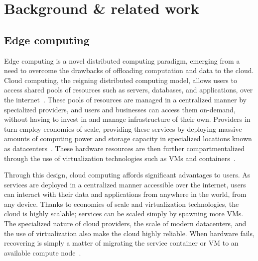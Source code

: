 \section{Background \& related work}

\subsection{Edge computing}

Edge computing is a novel distributed computing paradigm, emerging from a need to overcome the drawbacks of offloading computation and data to the cloud.
Cloud computing, the reigning distributed computing model, allows users to access shared pools of resources such as servers, databases, and applications, over the internet~\cite{gai2012towards}.
These pools of resources are managed in a centralized manner by specialized providers, and users and businesses can access them on-demand, without having to invest in and manage infrastructure of their own.
Providers in turn employ economies of scale, providing these services by deploying massive amounts of computing power and storage capacity in specialized locations known as datacenters~\citationeeded.
These hardware resources are then further compartmentalized through the use of virtualization technologies such as \glspl{VM} and containers~\cite{gai2012towards}.

Through this design, cloud computing affords significant advantages to users.
As services are deployed in a centralized manner accessible over the internet, users can interact with their data and applications from anywhere in the world, from any device.
Thanks to economies of scale and virtualization technologies, the cloud is highly scalable;
services can be scaled simply by spawning more \glspl{VM}.
The specialized nature of cloud providers, the scale of modern datacenters, and the use of virtualization also make the cloud highly reliable.
When hardware fails, recovering is simply a matter of migrating the service container or \gls{VM} to an available compute node~\cite{endo2016high}.

